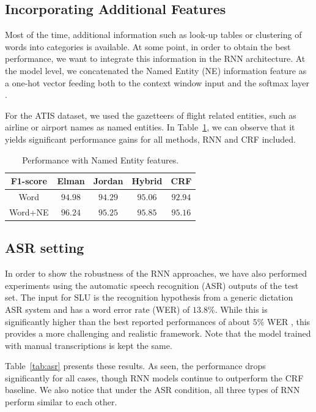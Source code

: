 \subsection{Incorporating Additional Features}

Most of the time, additional information such as look-up tables or clustering
of words into categories is available. At some point, in order to obtain the
best performance, we want to integrate this information in the RNN
architecture. At the model level, we concatenated the Named Entity (NE)
information feature as a one-hot vector feeding both to the context window
input and the softmax layer \citep{rnn49}. 

For the ATIS dataset, we used the gazetteers of flight related entities, such
as airline or airport names as named entities. In Table~\ref{tab:ne}, we can observe that
it yields significant performance gains for all methods, RNN and CRF included.

\begin{table}
\centering
\begin{tabular}{|c|c|c|c|c|}
\hline
F1-score &   Elman &  Jordan &  Hybrid & CRF \\
\hline
Word    & $94.98$ &  $94.29$ &  $95.06$ &  $92.94$ \\
Word+NE & $96.24$ &  $95.25$ &  $95.85$ &  $95.16$ \\
\hline
\end{tabular}
\caption{Performance with Named Entity features.}
\label{tab:ne}
\end{table}

\subsection{ASR setting}

In order to show the robustness of the RNN approaches, we have also performed
experiments using the automatic speech recognition (ASR) outputs of the test
set. The input for SLU is the recognition hypothesis from a generic dictation
ASR system and has a word error rate (WER) of $13.8\%$. While this is
significantly higher than the best reported performances of about $5\%$ WER \citep{rnn4},
this provides a more challenging and realistic framework. Note that the model
trained with manual transcriptions is kept the same.


Table~\ref{tab:asr} presents these results. As seen, the performance drops significantly
for all cases, though RNN models continue to outperform the CRF baseline. We
also notice that under the ASR condition, all three types of RNN perform
similar to each other.

